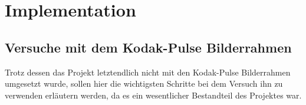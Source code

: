 \chapter{ Implementation }
\vspace*{-3cm}
\begin{flushleft}
\section{Versuche mit dem Kodak-Pulse Bilderrahmen}
  Trotz dessen das Projekt letztendlich nicht mit den Kodak-Pulse Bilderrahmen umgesetzt wurde, sollen hier die wichtigsten Schritte bei dem Versuch ihn zu verwenden erläutern werden, da es ein wesentlicher Bestandteil des Projektes war.

\end{flushleft}
